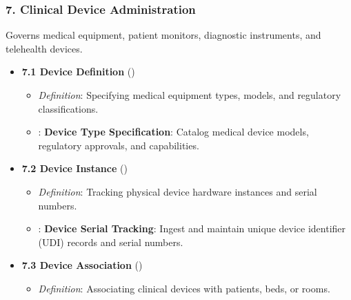 \subsubsection*{7. Clinical Device Administration}
\label{rad:enabling:216}

Governs medical equipment, patient monitors, diagnostic instruments, and telehealth devices.

\label{rad:enabling:218}

\begin{itemize}

\item 
\textbf{7.1 Device Definition} (\texttt{})


\begin{itemize}

\item 
\emph{Definition}: Specifying medical equipment types, models, and regulatory classifications.



\item 
\texttt{}: \textbf{Device Type Specification}: Catalog medical device models, regulatory approvals, and capabilities.



\end{itemize}


\item 
\textbf{7.2 Device Instance} (\texttt{})


\begin{itemize}

\item 
\emph{Definition}: Tracking physical device hardware instances and serial numbers.



\item 
\texttt{}: \textbf{Device Serial Tracking}: Ingest and maintain unique device identifier (UDI) records and serial numbers.



\end{itemize}


\item 
\textbf{7.3 Device Association} (\texttt{})


\begin{itemize}

\item 
\emph{Definition}: Associating clinical devices with patients, beds, or rooms.




\end{itemize}
\end{itemize}
